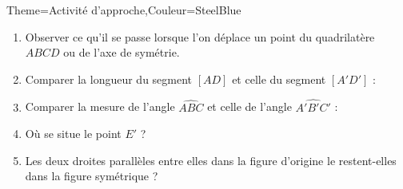 \begin{Maquette}[Cours]{Theme={Activité d'approche},Couleur={SteelBlue}}
\begin{AActivite}
\begin{center}
            \end{center}
            \begin{enumerate}
               \item Observer ce qu'il se passe lorsque l'on déplace un point du quadrilatère $ABCD$ ou de l'axe de symétrie.
               \item Comparer la longueur du segment $[AD]$ et celle du segment $[A'D']$ : \pointilles
               \item Comparer la mesure de l'angle $\widehat{ABC}$ et celle de l'angle $\widehat{A'B'C'}$ : \pointilles
               \item Où se situe le point $E'$ ? \pointilles
               \item Les deux droites parallèles entre elles dans la figure d'origine le restent-elles dans la figure symétrique ? \pointilles
            \end{enumerate}


\end{AActivite}
\end{Maquette}
